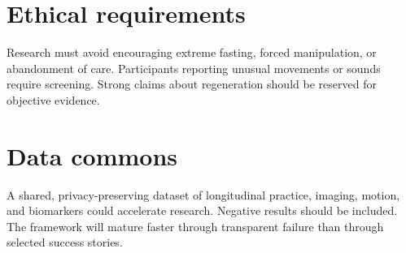 \section{Ethical requirements}\label{ethical-requirements}

Research must avoid encouraging extreme fasting, forced manipulation, or abandonment of care. Participants reporting unusual movements or sounds require screening. Strong claims about regeneration should be reserved for objective evidence.

\section{Data commons}\label{data-commons}

A shared, privacy-preserving dataset of longitudinal practice, imaging, motion, and biomarkers could accelerate research. Negative results should be included. The framework will mature faster through transparent failure than through selected success stories.
